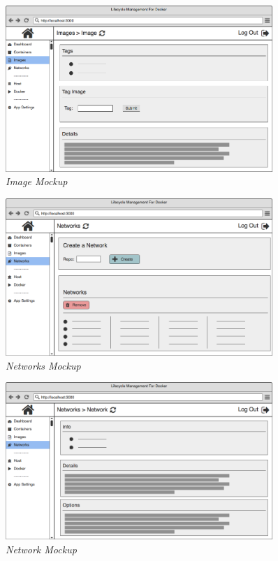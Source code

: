 \begin{figure}[!ht]
\centering
\includegraphics*[width=0.9\textwidth]{wireframes/image}
\caption{\em Image Mockup}
\end{figure}

\begin{figure}[!ht]
\centering
\includegraphics*[width=0.9\textwidth]{wireframes/networks}
\caption{\em Networks Mockup}
\end{figure}

\begin{figure}[!ht]
\centering
\includegraphics*[width=0.9\textwidth]{wireframes/network}
\caption{\em Network Mockup}
\end{figure}

